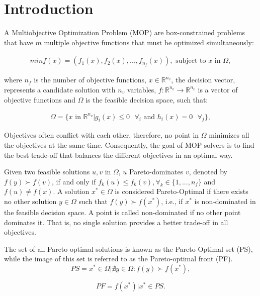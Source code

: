\section{Introduction}\label{intro}

A Multiobjective Optimization Problem (MOP)  are box-constrained problems that have $m$ multiple objective functions that must be optimized simultaneously:

\begin{align}\label{min_problem}
min f(x) = (f_1(x), f_2(x), ..., f_{n_f}(x)), \text{ subject to $x$ in $\Omega$},
\end{align}

where ${n_f}$ is the number of objective functions, $x \in \mathbb{R}^{n_v}$, the decision vector, represents a candidate solution with ${n_v}$ variables, $f: \mathbb{R}^{n_v} \rightarrow \mathbb{R}^{n_v}$ is a vector of objective functions and $\Omega$ is the feasible decision space, such that:

\begin{align}
	\Omega =\{x \text{ in } \mathbb{R}^{n_v} | g_i(x) \leq 0 \text{ } \forall_i \text{ and } h_i(x) = 0 \text{ } \forall_j \},
\end{align}

Objectives often conflict with each other, therefore, no point in $\Omega$ minimizes all the objectives at the same time. Consequently, the goal of MOP solvers is to find the best trade-off that balances the different objectives in an optimal way.


Given two feasible solutions $u, v$ in $\Omega$, $u$  Pareto-dominates $v$, denoted by $f(y) \succ f(v)$, if and only if $f_k(u) \leq f_k(v), \forall_k \in \{1,..., n_f\}$ and $ f(u) \neq f(x)$. A solution $x^* \in \Omega$ is considered Pareto-Optimal if there exists no other solution $y \in \Omega$ such that $f(y) \succ f(x^*)$, i.e., if $x^*$ is non-dominated in the feasible decision space. A point is called non-dominated if no other point dominates it. That is, no single solution provides a better trade-off in all objectives.

The set of all Pareto-optimal solutions is known as the Pareto-Optimal set (PS), while the image of this set is referred to as the Pareto-optimal front (PF).\\

\begin{equation}
	PS = {x^* \in \Omega | \nexists y \in \Omega : f(y) \succ f(x^*)  },
\end{equation}

\begin{equation}
	PF = {f(x^*) | x^* \in PS }.
\end{equation}
